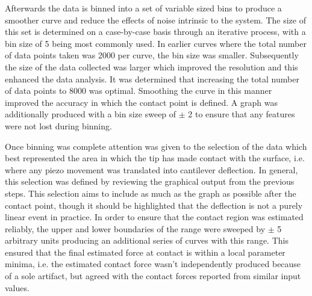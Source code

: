 
Afterwards the data is binned into a set of variable sized bins to produce a smoother curve and reduce the effects of noise intrinsic to the system. The size of this set is determined on a case-by-case basis through an iterative process, with a bin size of 5 being most commonly used. In earlier curves where the total number of data points taken was 2000 per curve, the bin size was smaller. Subsequently the size of the data collected was larger which improved the resolution and this enhanced the data analysis. It was determined that increasing the total number of data points to 8000 was optimal. Smoothing the curve in this manner improved the accuracy in which the contact point is defined. A graph was additionally produced with a bin size sweep of $\pm$ 2 to ensure that any features were not lost during binning.


Once binning was complete attention was given to the selection of the data which best represented the area in which the tip has made contact with the surface, i.e. where any piezo movement was translated into cantilever deflection. In general, this selection was defined by reviewing the graphical output from the previous steps. This selection aims to include as much as the graph as possible after the contact point, though it should be highlighted that the deflection is not a purely linear event in practice. In order to ensure that the contact region was estimated reliably, the upper and lower boundaries of the range were sweeped by $\pm$ 5 arbitrary units producing an additional series of curves with this range. This ensured that the final estimated force at contact is within a local parameter minima, i.e. the estimated contact force wasn't independently produced because of a sole artifact, but agreed with the contact forces reported from similar input values.

